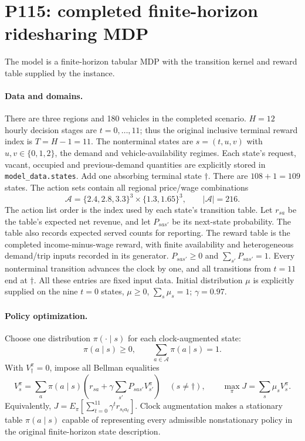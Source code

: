 \documentclass[11pt]{article}
\begin{document}
\section*{P115: completed finite-horizon ridesharing MDP}
The model is a finite-horizon tabular MDP with the transition kernel and reward table supplied by the instance.

\paragraph{Data and domains.}
There are three regions and 180 vehicles in the completed scenario.
$H=12$ hourly decision stages are $t=0,\ldots,11$; thus the original inclusive
terminal reward index is $T=H-1=11$.
The nonterminal states are $s=(t,u,v)$ with $u,v\in\{0,1,2\}$,
the demand and vehicle-availability regimes. Each state's request, vacant,
occupied and previous-demand quantities are explicitly stored in
\texttt{model\_data.states}. Add one absorbing terminal state $\dagger$.
There are $108+1=109$ states.
The action sets contain all regional price/wage combinations
\[
\mathcal A=\{2.4,2.8,3.3\}^{3}\times\{1.3,1.65\}^{3},
\qquad |\mathcal A|=216.
\]
The action list order is the index used by each state's transition table.
Let $r_{sa}$ be the table's expected net revenue, and let $P_{sas'}$
be its next-state probability. The table also records expected served counts
for reporting.
The reward table is the completed income-minus-wage reward, with finite
availability and heterogeneous demand/trip inputs recorded in its generator.
$P_{sas'}\ge0$ and $\sum_{s'}P_{sas'}=1$.
Every nonterminal transition advances the clock by one, and all transitions
from $t=11$ end at $\dagger$. All these entries are fixed input data.
Initial distribution $\mu$ is explicitly supplied on the nine $t=0$ states,
$\mu\ge0$, $\sum_s\mu_s=1$; $\gamma=0.97$.

\paragraph{Policy optimization.}
Choose one distribution $\pi(\cdot\mid s)$ for each clock-augmented state:
\[
\pi(a\mid s)\ge0,\qquad \sum_{a\in\mathcal A}\pi(a\mid s)=1.
\]
With $V^\pi_\dagger=0$, impose all Bellman equalities
\[
V^\pi_s=\sum_a\pi(a\mid s)
 \left(r_{sa}+\gamma\sum_{s'}P_{sas'}V^\pi_{s'}\right)
 \quad(s\ne\dagger),
\qquad
\max_\pi J=\sum_s\mu_sV^\pi_s.
\]
Equivalently,
$J=E_\pi[\sum_{t=0}^{11}\gamma^t r_{s_ta_t}]$.
Clock augmentation makes a stationary table $\pi(a\mid s)$ capable of
representing every admissible nonstationary policy in the original
finite-horizon state description.
\end{document}
